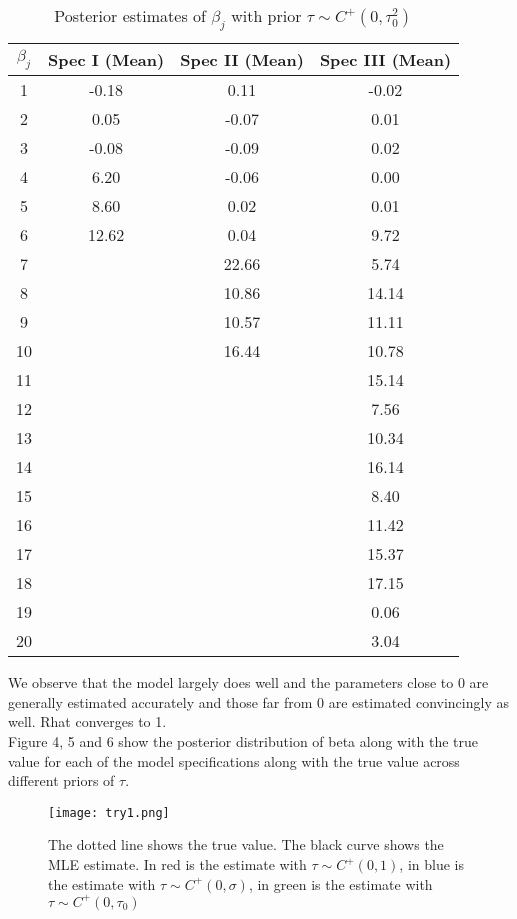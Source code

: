 \documentclass{article}
\begin{document}
\begin{table}[H]
\caption {Posterior estimates of $\beta_j$ with prior $\tau \sim C^{+}(0, \tau_0^2)$}
\vspace{2mm}
\def\arraystretch{1.5}
\centering \begin{tabular}{c c c c} 
\hline\hline 
\vspace{1mm}
$\beta_j$ & Spec I (Mean)& Spec II (Mean) & Spec III (Mean)\\ [0.5ex] 
\hline
1& -0.18& 0.11 & -0.02\\
2& 0.05 & -0.07 & 0.01\\
3& -0.08 & -0.09 & 0.02\\
4& 6.20 & -0.06 & 0.00\\
5& 8.60 & 0.02 & 0.01\\
6&12.62 &0.04 & 9.72\\
7& & 22.66 & 5.74\\
8& & 10.86 & 14.14\\
9& & 10.57 & 11.11\\
10& & 16.44 & 10.78\\
11&&& 15.14\\
12&&& 7.56\\
13&&& 10.34\\
14&&& 16.14\\
15&&& 8.40\\
16&&& 11.42\\
17&&& 15.37\\
18&&& 17.15\\
19&&& 0.06\\
20&&& 3.04\\
\hline
\hline 
\end{tabular}
\end{table}
We observe that the model largely does well and the parameters close to 0 are generally estimated accurately and those far from 0 are estimated convincingly as well. Rhat converges to 1.\\
Figure 4, 5 and 6 show the posterior distribution of beta along with the true value for each of the model specifications along with the true value across different priors of $\tau$.
 \begin{figure}[H]
\centering
\texttt{[image: try1.png]}
\caption{The dotted line shows the true value. The black curve shows the MLE estimate. In red is the estimate with $\tau \sim C^{+}(0, 1)$, in blue is the estimate with $\tau \sim C^{+}(0, \sigma)$, in green is the estimate with $\tau \sim C^{+}(0, \tau_0)$ }
\label{deltat}
\end{figure}
\end{document}

